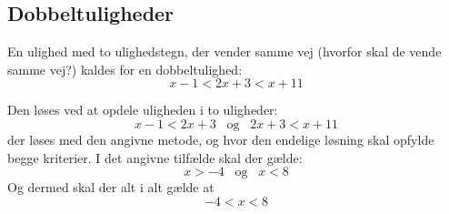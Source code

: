 \documentclass[12pt,oneside,a4paper]{article}
\begin{document}
\subsection{Dobbeltuligheder}
En ulighed med to ulighedstegn, der vender samme vej (hvorfor skal de vende samme vej?) kaldes for en dobbeltulighed:
$$
x-1 < 2x + 3 < x+11
$$

Den løses ved at opdele uligheden i to uligheder:
$$
x - 1 < 2x + 3 \;\;\; \text{og} \;\;\; 2x + 3 < x + 11
$$
der løses med den angivne metode, og hvor den endelige løsning skal opfylde begge kriterier. I det angivne tilfælde skal der gælde:
$$
x>-4 \;\;\; \text{og} \;\;\; x<8
$$
Og dermed skal der alt i alt gælde at
$$
-4 < x < 8
$$
\end{document}
